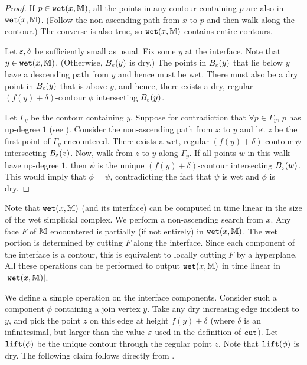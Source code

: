 \begin{proof} If $p \in {\tt wet}(x,\mathbb{M})$, all the points in any contour containing $p$ are also in ${\tt wet}(x,\mathbb{M})$.
 (Follow the non-ascending path from $x$ to $p$ and then walk along the contour.) The converse is also true,
 so ${\tt wet}(x,\mathbb{M})$ contains entire contours.

Let $\varepsilon, \delta$ be sufficiently small as usual. Fix some $y$ at the interface.
Note that $y \in {\tt wet}(x,\mathbb{M})$. (Otherwise, $B_\varepsilon(y)$ is dry.)
The points in $B_\varepsilon(y)$ that lie below $y$ have a descending path from $y$ and hence must be wet.
There must also be a dry point in $B_\varepsilon(y)$ that is above $y$, and hence,
there exists a dry, regular $(f(y)+\delta)$-contour $\phi$ intersecting $B_\varepsilon(y)$.

Let $\Gamma_y$ be the contour containing $y$.  Suppose for contradiction
that $\forall p \in \Gamma_y$, $p$ has up-degree $1$ (see ). Consider the non-ascending path from $x$ to $y$ and let $z$
be the first point of $\Gamma_y$ encountered. There exists a wet, regular $(f(y) + \delta)$-contour $\psi$ 
intersecting $B_\varepsilon(z)$. Now, walk from $z$ to $y$ along $\Gamma_y$. If all points $w$ in this walk
have up-degree $1$, then $\psi$ is the unique $(f(y)+\delta)$-contour
intersecting $B_\varepsilon(w)$. This would imply that $\phi = \psi$, contradicting the fact that $\psi$ is wet
and $\phi$ is dry.
%
\end{proof}

Note that ${\tt wet}(x,\mathbb{M})$ (and its interface) can be computed in time linear in the size of the wet simplicial complex.
We perform a non-ascending search from $x$. Any face $F$ of $\mathbb{M}$ encountered is partially (if not entirely) in ${\tt wet}(x,\mathbb{M})$.
The wet portion is determined by cutting $F$ along the interface. Since each component of the interface is a contour, this is equivalent
to locally cutting $F$ by a hyperplane. All these operations can be performed to output ${\tt wet}(x,\mathbb{M})$ in time linear in $|{\tt wet}(x,\mathbb{M})|$.


We define a simple \lift{} operation on the interface components. Consider such a component $\phi$ containing
a join vertex $y$. Take any dry increasing edge incident to $y$, and pick the point $z$ on this edge at height
$f(y) + \delta$ (where $\delta$ is an infinitesimal, but larger than the value $\varepsilon$ used in the definition of ${\tt cut}$). 
Let ${\tt lift}(\phi)$ be the unique contour through the regular point $z$. Note that ${\tt lift}(\phi)$ is dry.
The following claim follows directly from .

